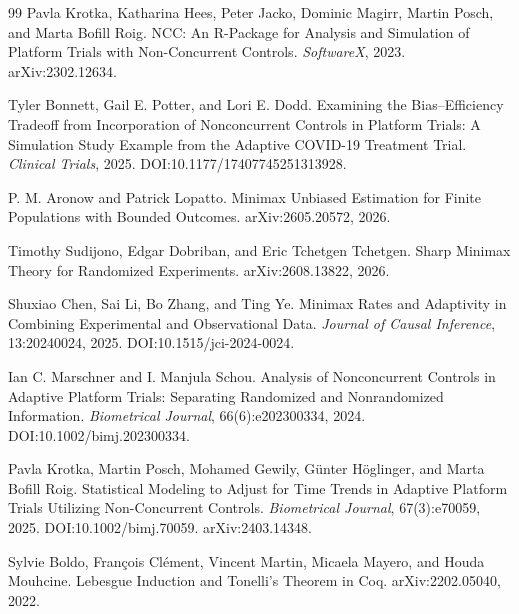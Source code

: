 \documentclass{article}
\begin{document}
\begin{thebibliography}{99}
   Pavla Krotka, Katharina Hees, Peter Jacko, Dominic Magirr, Martin Posch, and Marta Bofill Roig. NCC: An R-Package for Analysis and Simulation of Platform Trials with Non-Concurrent Controls. \emph{SoftwareX}, 2023. arXiv:2302.12634.

   Tyler Bonnett, Gail E. Potter, and Lori E. Dodd. Examining the Bias--Efficiency Tradeoff from Incorporation of Nonconcurrent Controls in Platform Trials: A Simulation Study Example from the Adaptive COVID-19 Treatment Trial. \emph{Clinical Trials}, 2025. DOI:10.1177/17407745251313928.

   P. M. Aronow and Patrick Lopatto. Minimax Unbiased Estimation for Finite Populations with Bounded Outcomes. arXiv:2605.20572, 2026.

   Timothy Sudijono, Edgar Dobriban, and Eric Tchetgen Tchetgen. Sharp Minimax Theory for Randomized Experiments. arXiv:2608.13822, 2026.

   Shuxiao Chen, Sai Li, Bo Zhang, and Ting Ye. Minimax Rates and Adaptivity in Combining Experimental and Observational Data. \emph{Journal of Causal Inference}, 13:20240024, 2025. DOI:10.1515/jci-2024-0024.

   Ian C. Marschner and I. Manjula Schou. Analysis of Nonconcurrent Controls in Adaptive Platform Trials: Separating Randomized and Nonrandomized Information. \emph{Biometrical Journal}, 66(6):e202300334, 2024. DOI:10.1002/bimj.202300334.

   Pavla Krotka, Martin Posch, Mohamed Gewily, Günter Höglinger, and Marta Bofill Roig. Statistical Modeling to Adjust for Time Trends in Adaptive Platform Trials Utilizing Non-Concurrent Controls. \emph{Biometrical Journal}, 67(3):e70059, 2025. DOI:10.1002/bimj.70059. arXiv:2403.14348.

   Sylvie Boldo, François Clément, Vincent Martin, Micaela Mayero, and Houda Mouhcine. Lebesgue Induction and Tonelli's Theorem in Coq. arXiv:2202.05040, 2022.

\end{thebibliography}
\end{document}
